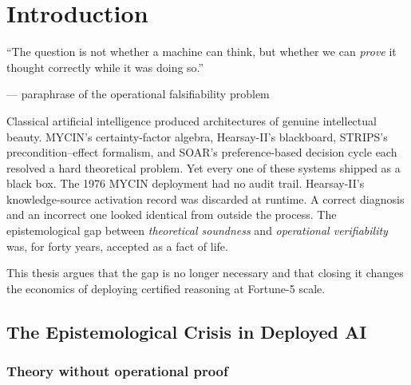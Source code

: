 
\chapter{Introduction}
\label{chap:introduction}

\epigraph{%
  ``The question is not whether a machine can think, but whether we can \emph{prove} it thought
  correctly while it was doing so.''
}{--- paraphrase of the operational falsifiability problem}

Classical artificial intelligence produced architectures of genuine intellectual beauty.
MYCIN's certainty-factor algebra, Hearsay-II's blackboard, STRIPS's precondition--effect
formalism, and SOAR's preference-based decision cycle each resolved a hard theoretical
problem.
Yet every one of these systems shipped as a black box.
The 1976 MYCIN deployment had no audit trail.
Hearsay-II's knowledge-source activation record was discarded at runtime.
A correct diagnosis and an incorrect one looked identical from outside the process.
The epistemological gap between \emph{theoretical soundness} and \emph{operational
verifiability} was, for forty years, accepted as a fact of life.

This thesis argues that the gap is no longer necessary and that closing it changes the
economics of deploying certified reasoning at Fortune-5 scale.

\section{The Epistemological Crisis in Deployed AI}
\label{sec:epistemological-crisis}

\subsection{Theory without operational proof}

